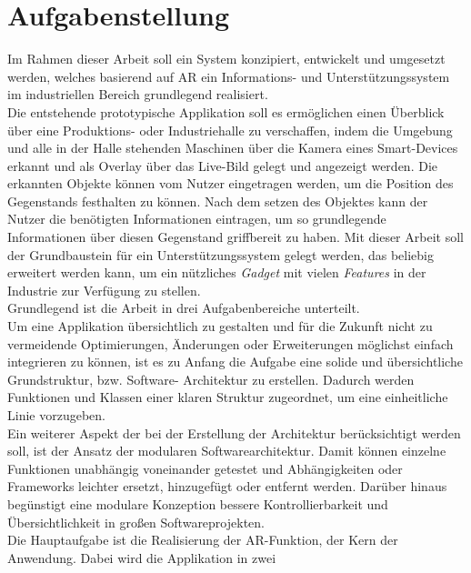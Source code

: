 \section{Aufgabenstellung}
\label{chap:Aufgabenstellung}          %
Im Rahmen dieser Arbeit soll ein System konzipiert, entwickelt und umgesetzt werden, welches basierend auf \acl{AR} ein 
Informations- und Unterstützungssystem im industriellen Bereich grundlegend realisiert.
\\
Die entstehende prototypische Applikation soll es ermöglichen einen Überblick über eine Produktions- oder Industriehalle zu 
verschaffen, indem die Umgebung und alle in der Halle stehenden Maschinen über die Kamera eines Smart-Devices erkannt und als 
Overlay über das Live-Bild gelegt und angezeigt werden. Die erkannten Objekte können vom Nutzer eingetragen werden, um die Position des 
Gegenstands festhalten zu können. Nach dem setzen des Objektes kann der Nutzer die benötigten Informationen eintragen, um so 
grundlegende Informationen über diesen Gegenstand griffbereit zu haben. Mit dieser Arbeit soll der Grundbaustein für ein 
Unterstützungssystem gelegt werden, das beliebig erweitert werden kann, um ein nützliches \textit{Gadget} mit vielen \textit{Features} 
in der Industrie zur Verfügung zu stellen.
\\ 
\linebreak
Grundlegend ist die Arbeit in drei Aufgabenbereiche unterteilt.
\\
\linebreak
Um eine Applikation übersichtlich zu gestalten und für die Zukunft nicht zu vermeidende Optimierungen, Änderungen oder Erweiterungen 
möglichst einfach integrieren zu können, ist es zu Anfang die Aufgabe eine solide und übersichtliche Grundstruktur, bzw. Software-
Architektur zu erstellen. Dadurch werden Funktionen und Klassen einer klaren Struktur zugeordnet, um eine einheitliche Linie vorzugeben. 
\\
Ein weiterer Aspekt der bei der Erstellung der Architektur berücksichtigt werden soll, ist der Ansatz der modularen 
Softwarearchitektur. Damit können einzelne Funktionen unabhängig voneinander getestet und Abhängigkeiten oder Frameworks leichter 
ersetzt, hinzugefügt oder entfernt werden. Darüber hinaus begünstigt eine modulare Konzeption bessere Kontrollierbarkeit und Übersichtlichkeit 
in großen Softwareprojekten.
\\
\linebreak
Die Hauptaufgabe ist die Realisierung der \acl{AR}-Funktion, der Kern der Anwendung. Dabei wird die Applikation in zwei 
